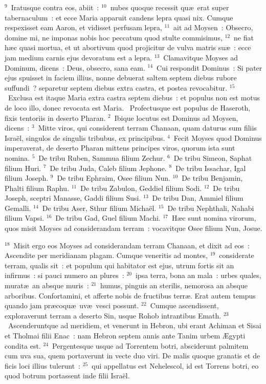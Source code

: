 ${}^{9}$~Iratusque contra eos, abiit~:
${}^{10}$~nubes quoque recessit qu\ae\ erat super tabernaculum~: et ecce Maria apparuit candens lepra quasi nix. Cumque respexisset eam Aaron, et vidisset perfusam lepra,
${}^{11}$~ait ad Moysen~: Obsecro, domine mi, ne imponas nobis hoc peccatum quod stulte commisimus,
${}^{12}$~ne fiat h\ae c quasi mortua, et ut abortivum quod projicitur de vulva matris su\ae~: ecce jam medium carnis ejus devoratum est a lepra.
${}^{13}$~Clamavitque Moyses ad Dominum, dicens~: Deus, obsecro, sana eam.
${}^{14}$~Cui respondit Dominus~: Si pater ejus spuisset in faciem illius, nonne debuerat saltem septem diebus rubore suffundi~? separetur septem diebus extra castra, et postea revocabitur.
${}^{15}$~Exclusa est itaque Maria extra castra septem diebus~: et populus non est motus de loco illo, donec revocata est Maria.
~\lettrine[lines=10,image=true,loversize=0.05,lraise=-0.03]{P}{}rofectusque est populus de Haseroth, fixis tentoriis in deserto Pharan.
${}^{2}$~Ibique locutus est Dominus ad Moysen, dicens~:
${}^{3}$~Mitte viros, qui considerent terram Chanaan, quam daturus sum filiis Isra\"el, singulos de singulis tribubus, ex principibus.
${}^{4}$~Fecit Moyses quod Dominus imperaverat, de deserto Pharan mittens principes viros, quorum ista sunt nomina.
${}^{5}$~De tribu Ruben, Sammua filium Zechur.
${}^{6}$~De tribu Simeon, Saphat filium Huri.
${}^{7}$~De tribu Juda, Caleb filium Jephone.
${}^{8}$~De tribu Issachar, Igal filium Joseph.
${}^{9}$~De tribu Ephraim, Osee filium Nun.
${}^{10}$~De tribu Benjamin, Phalti filium Raphu.
${}^{11}$~De tribu Zabulon, Geddiel filium Sodi.
${}^{12}$~De tribu Joseph, sceptri Manasse, Gaddi filium Susi.
${}^{13}$~De tribu Dan, Ammiel filium Gemalli.
${}^{14}$~De tribu Aser, Sthur filium Micha\"el.
${}^{15}$~De tribu Nephthali, Nahabi filium Vapsi.
${}^{16}$~De tribu Gad, Guel filium Machi.
${}^{17}$~H\ae c sunt nomina virorum, quos misit Moyses ad considerandam terram~: vocavitque Osee filium Nun, Josue.


${}^{18}$~Misit ergo eos Moyses ad considerandam terram Chanaan, et dixit ad eos~: Ascendite per meridianam plagam. Cumque veneritis ad montes,
${}^{19}$~considerate terram, qualis sit~: et populum qui habitator est ejus, utrum fortis sit an infirmus~: si pauci numero an plures~:
${}^{20}$~ipsa terra, bona an mala~: urbes quales, murat\ae\ an absque muris~:
${}^{21}$~humus, pinguis an sterilis, nemorosa an absque arboribus. Confortamini, et afferte nobis de fructibus terr\ae . Erat autem tempus quando jam pr\ae coqu\ae\ uv\ae\ vesci possunt.
${}^{22}$~Cumque ascendissent, exploraverunt terram a deserto Sin, usque Rohob intrantibus Emath.
${}^{23}$~Ascenderuntque ad meridiem, et venerunt in Hebron, ubi erant Achiman et Sisai et Tholmai filii Enac~: nam Hebron septem annis ante Tanim urbem \AE gypti condita est.
${}^{24}$~Pergentesque usque ad Torrentem botri, absciderunt palmitem cum uva sua, quem portaverunt in vecte duo viri. De malis quoque granatis et de ficis loci illius tulerunt~:
${}^{25}$~qui appellatus est Nehelescol, id est Torrens botri, eo quod botrum portassent inde filii Isra\"el.



